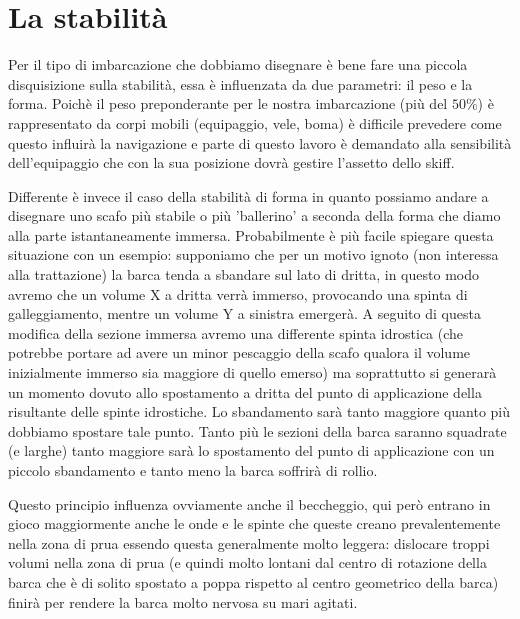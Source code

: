 \chapter{La stabilità}
Per il tipo di imbarcazione che dobbiamo disegnare è bene fare una piccola disquisizione sulla stabilità, essa è influenzata da due parametri: il peso e la forma. Poichè il peso preponderante per le nostra imbarcazione (più del $50\%$) è rappresentato da corpi mobili (equipaggio, vele, boma) è difficile prevedere come questo influirà la navigazione e parte di questo lavoro è demandato alla sensibilità dell'equipaggio che con la sua posizione dovrà gestire l'assetto dello skiff.

Differente è invece il caso della stabilità di forma in quanto possiamo andare a disegnare uno scafo più stabile o più 'ballerino' a seconda della forma che diamo alla parte istantaneamente immersa. Probabilmente è più facile spiegare questa situazione con un esempio: supponiamo che per un motivo ignoto (non interessa alla trattazione) la barca tenda a sbandare sul lato di dritta, in questo modo avremo che un volume X a dritta verrà immerso, provocando una spinta di galleggiamento, mentre un volume Y a sinistra emergerà.
A seguito di questa modifica della sezione immersa avremo una differente spinta idrostica (che potrebbe portare ad avere un minor pescaggio della scafo qualora il volume inizialmente immerso sia maggiore di quello emerso) ma soprattutto si generarà un momento dovuto allo spostamento a dritta del punto di applicazione della risultante delle spinte idrostiche. Lo sbandamento sarà tanto maggiore quanto più dobbiamo spostare tale punto.
Tanto più le sezioni della barca saranno squadrate (e larghe) tanto maggiore sarà lo spostamento del punto di applicazione con un piccolo sbandamento e tanto meno la barca soffrirà di rollio.

Questo principio influenza ovviamente anche il beccheggio, qui però entrano in gioco maggiormente anche le onde e le spinte che queste creano prevalentemente nella zona di prua essendo questa generalmente molto leggera: dislocare troppi volumi nella zona di prua (e quindi molto lontani dal centro di rotazione della barca che è di solito spostato a poppa rispetto al centro geometrico della barca) finirà per rendere la barca molto nervosa su mari agitati.